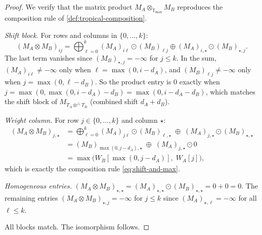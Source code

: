\documentclass[11pt]{article}
\theoremstyle{plain}
\theoremstyle{definition}
\theoremstyle{remark}
\newcommand{\optrop}{\otimes^{\triangle}}
\newcommand{\Tmax}{\mathbb{T}_{\max}}
\begin{document}
\begin{proof}
We verify that the matrix product $M_A \otimes_{\Tmax} M_B$ reproduces
the composition rule of \cref{def:tropical-composition}.

\emph{Shift block.}  For rows and columns in $\{0, \ldots, k\}$:
\[
  (M_A \otimes M_B)_{ij}
  = \bigoplus_{\ell=0}^{k} (M_A)_{i\ell} \odot (M_B)_{\ell j}
  \oplus (M_A)_{i,\star} \odot (M_B)_{\star,j}.
\]
The last term vanishes since $(M_B)_{\star,j} = -\infty$ for
$j \le k$.  In the sum, $(M_A)_{i\ell} \ne -\infty$ only when
$\ell = \max(0, i - d_A)$, and $(M_B)_{\ell j} \ne -\infty$ only when
$j = \max(0, \ell - d_B)$.  So the product entry is $0$ exactly when
$j = \max(0, \max(0, i - d_A) - d_B) = \max(0, i - d_A - d_B)$,
which matches the shift block of $M_{T_A \optrop T_B}$ (combined shift
$d_A + d_B$).

\emph{Weight column.}  For row $j \in \{0, \ldots, k\}$ and column
$\star$:
\begin{align*}
  (M_A \otimes M_B)_{j,\star}
  &= \bigoplus_{\ell=0}^{k} (M_A)_{j\ell} \odot (M_B)_{\ell,\star}
     \;\oplus\; (M_A)_{j,\star} \odot (M_B)_{\star,\star}\\
  &= (M_B)_{\max(0,j-d_A),\star}
     \;\oplus\; (M_A)_{j,\star} \odot 0\\
  &= \max\!\bigl(W_B[\max(0, j - d_A)],\; W_A[j]\bigr),
\end{align*}
which is exactly the composition rule \eqref{eq:shift-and-max}.

\emph{Homogeneous entries.}  $(M_A \otimes M_B)_{\star,\star} =
(M_A)_{\star,\star} \odot (M_B)_{\star,\star} = 0 + 0 = 0$.  The
remaining entries $(M_A \otimes M_B)_{\star,j} = -\infty$ for $j \le k$
since $(M_A)_{\star,\ell} = -\infty$ for all $\ell \le k$.

All blocks match.  The isomorphism follows.
\end{proof}
\end{document}
